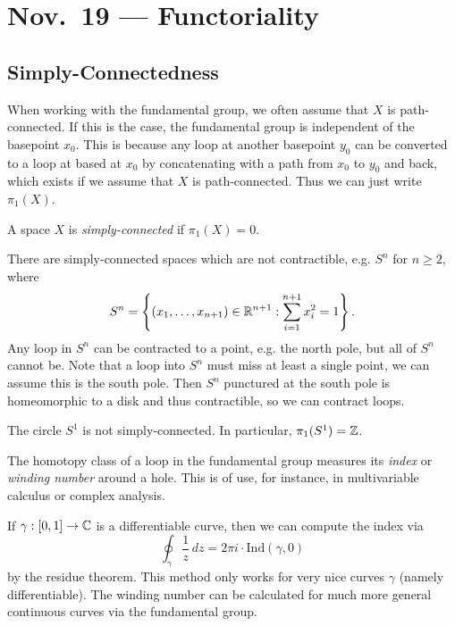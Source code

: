 \chapter{Nov.~19 --- Functoriality}

\section{Simply-Connectedness}
\begin{remark}
  When working with the fundamental group, we
  often assume that $X$ is path-connected. If this
  is the case, the fundamental group is independent
  of the basepoint $x_0$. This is because any
  loop at another basepoint $y_0$ can be converted
  to a loop at based at $x_0$ by concatenating with
  a path from $x_0$ to $y_0$ and back, which exists
  if we assume that $X$ is path-connected.
  Thus we can just write $\pi_1(X)$.
\end{remark}

\begin{definition}
  A space $X$ is \emph{simply-connected} if
  $\pi_1(X) = 0$.
\end{definition}

\begin{remark}
  There are simply-connected spaces
  which are not contractible, e.g. $S^n$ for
  $n \ge 2$, where
  \[
    S^n = \left\{(x_1, \dots, x_{n + 1}) \in \mathbb{R}^{n + 1} : \sum_{i = 1}^{n + 1} x_i^2 = 1\right\}.
  \]
  Any loop in $S^n$ can be contracted to a point,
  e.g. the north pole, but all of $S^n$ cannot be.
  Note that a loop into $S^n$ must miss at least
  a single point, we can assume this is the south
  pole. Then $S^n$ punctured at the south pole is
  homeomorphic to a disk and thus contractible, so
  we can contract loops.
\end{remark}

\begin{prop}
  The circle $S^1$ is not simply-connected. In
  particular, $\pi_1(S^1) = \mathbb{Z}$.
\end{prop}

\begin{remark}
  The homotopy class of a loop in the fundamental
  group measures its \emph{index} or
  \emph{winding number} around a hole. This is
  of use, for instance, in multivariable calculus
  or complex analysis.
\end{remark}

\begin{remark}
  If $\gamma : [0, 1] \to \mathbb{C}$ is a differentiable
  curve, then we can compute the index via
  \[
    \oint_{\gamma} \frac{1}{z}\, dz
    = 2\pi i \cdot \mathrm{Ind}(\gamma, 0)
  \]
  by the residue theorem. This method only works for
  very nice curves $\gamma$ (namely differentiable).
  The winding number can be calculated for much
  more general continuous curves via the fundamental
  group.
\end{remark}

